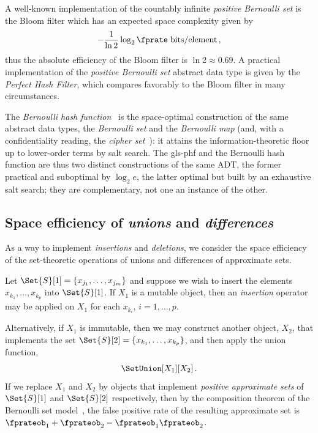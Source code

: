 \documentclass[ ../main.tex]{subfiles}
\begin{document}
A well-known implementation of the countably infinite \emph{positive Bernoulli
set} is the Bloom filter\cite{bf} which has an expected space complexity given
by
\begin{equation}
    -\frac{1}{\ln 2} \log_2 \fprate \; \si{bits \per element}\,,
\end{equation}
thus the absolute efficiency of the Bloom filter is $\ln 2 \approx 0.69$. 
A practical implementation of the \emph{positive Bernoulli set} abstract data
type is given by the \emph{Perfect Hash Filter}\cite{phf}, which compares
favorably to the Bloom filter in many circumstances.

The \emph{Bernoulli hash function}~\cite{shs} is the space-optimal construction
of the same abstract data types, the \emph{Bernoulli set} and the \emph{Bernoulli
map} (and, with a confidentiality reading, the \emph{cipher set}~\cite{obset}):
it attains the information-theoretic floor up to lower-order terms by salt search. The
\gls{gls-phf} and the Bernoulli hash function are thus two distinct constructions
of the same ADT, the former practical and suboptimal by $\log_2 e$, the latter
optimal but built by an exhaustive salt search; they are complementary, not one
an instance of the other.

\subsection{Space efficiency of \emph{unions} and \emph{differences}}
As a way to implement \emph{insertions} and \emph{deletions}, we consider the 
space efficiency of the set-theoretic operations of unions and differences of 
approximate sets.

Let $\Set{S}[1] = \{x_{j_1}, \ldots, x_{j_m}\}$ and suppose we wish to insert 
the elements $x_{k_1},\ldots,x_{k_p}$ into $\Set{S}[1]$. If $X_1$ is a mutable 
object, then an \emph{insertion} operator may be applied on $X_1$ for each 
$x_{k_i}$, $i=1,\ldots, p$.

Alternatively, if $X_1$ is immutable, then we may construct another object, 
$X_2$, that implements the set $\Set{S}[2] = \{x_{k_1},\ldots, x_{k_p}\}$, and 
then apply the union function,
\begin{equation}
    \SetUnion[X_1][X_2]\,.
\end{equation}
If we replace $X_1$ and $X_2$ by objects that implement \emph{positive
approximate sets} of $\Set{S}[1]$ and $\Set{S}[2]$ respectively, then by
the composition theorem of the Bernoulli set model~\cite{bsets}, the false
positive rate of the resulting approximate set is
$\fprateob_1 + \fprateob_2 - \fprateob_1 \fprateob_2$.
\end{document}
